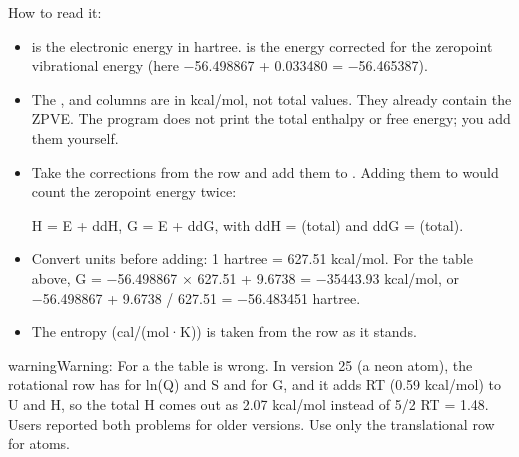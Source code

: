 \documentclass[letterpaper,10pt,english,openany,oneside]{sphinxmanual}
\begin{document}
\sphinxAtStartPar
How to read it:
\begin{itemize}
\item {} 
\sphinxAtStartPar
{} is the electronic energy in hartree.  is the energy corrected for the zero\sphinxhyphen{}point vibrational
energy (here −56.498867 + 0.033480 = −56.465387).

\item {} 
\sphinxAtStartPar
The ,  and  columns are  in kcal/mol, not total values. They already contain the
ZPVE. The program does not print the total enthalpy or free energy; you add them yourself.

\item {} 
\sphinxAtStartPar
Take the corrections from the  row and add them to . Adding them to  would count the
zero\sphinxhyphen{}point energy twice:

\sphinxAtStartPar
H = E + ddH,  G = E + ddG,  with ddH =  (total) and ddG =  (total).

\item {} 
\sphinxAtStartPar
Convert units before adding: 1 hartree = 627.51 kcal/mol. For the table above,
G = −56.498867 × 627.51 + 9.6738 = −35443.93 kcal/mol, or −56.498867 + 9.6738 / 627.51 = −56.483451 hartree.

\item {} 
\sphinxAtStartPar
The entropy  (cal/(mol·K)) is taken from the  row as it stands.

\end{itemize}



\begin{sphinxadmonition}{warning}{Warning:}
\sphinxAtStartPar
For a  the table is wrong. In version 25 (a neon atom), the rotational row has  for ln(Q)
and S and  for G, and it adds RT (0.59 kcal/mol) to U and H, so the total H comes out as 2.07 kcal/mol instead
of 5/2 RT = 1.48. Users reported both problems for older versions. Use only the translational row for atoms.


\end{sphinxadmonition}
\end{document}
